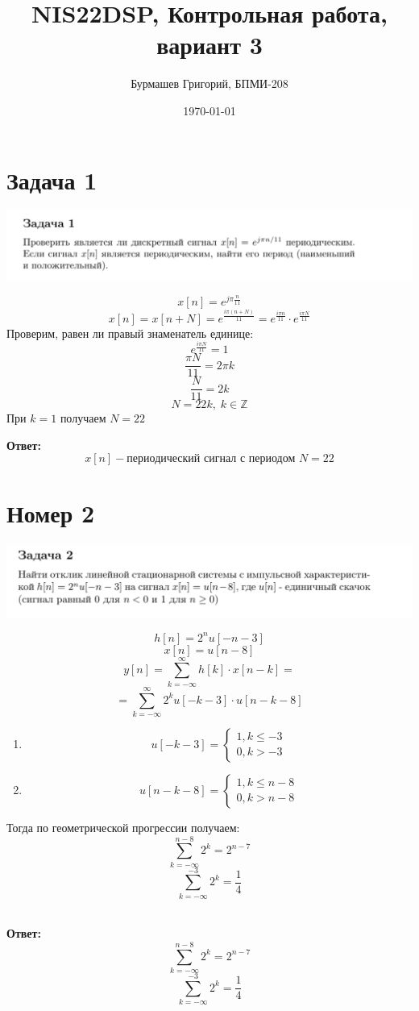 \documentclass[a4paper,12pt]{article}
\author{Бурмашев Григорий, БПМИ-208}
\title{NIS22DSP, Контрольная работа, вариант 3}
\date{\today}
\begin{document}
\maketitle

\section*{Задача 1}
\begin{center}
\includegraphics[scale=0.4]{1.png}
\end{center}
\[
x[n] = e^{j \pi \frac{n}{11}}
\]
\[
x[n] = x[n + N] = e^{\frac{i \pi (n + N)}{11}} = 
e^{\frac{i \pi n}{11}} \cdot e^{\frac{i \pi N}{11}}
\]
Проверим, равен ли правый знаменатель единице:
\[
e^{\frac{i \pi N}{11}} = 1
\]
\[
\frac{\pi N }{11} = 2 \pi k
\]
\[
\frac{N}{11} = 2 k
\]
\[
N = 22k, \; k \in \mathbb{Z}
\]
При $k = 1$ получаем $N = 22$
\begin{center}
\textbf{Ответ: } 
\[
x[n] - \text{периодический сигнал с периодом } N = 22
\]
\end{center}
\clearpage
\section*{Номер 2}
\begin{center}
\includegraphics[scale=0.4]{2.png}
\end{center}
\[
h[n] = 2^n u [-n - 3]
\]
\[
x[n] = u[n - 8]
\]
\[
y[n] = \sum_{k = -\infty}^{\infty } h[k] \cdot x[n - k]  = 
\]
\[
=
\sum_{k = -\infty}^{\infty }  
2^k u[-k - 3] \cdot u[n - k - 8]
\]
\begin{enumerate}
\item
\[
u[-k - 3] = 
\begin{cases}
1, k \leq -3 \\
0, k > -3
\end{cases}
\]
\item
\[
u[n - k - 8 ] = 
\begin{cases}
1, k  \leq n - 8 \\
0, k > n - 8
\end{cases}
\]
\end{enumerate}
Тогда по геометрической прогрессии получаем:
\[
\sum_{k=-\infty}^{n - 8} 2^k = 2^{n - 7}
\]
\[
\sum_{k=-\infty}^{-3} 2^k = \frac{1}{4}
\] 
\begin{center}
\textbf{Ответ: } 
\[
\sum_{k=-\infty}^{n - 8} 2^k = 2^{n - 7}
\]
\[
\sum_{k=-\infty}^{-3} 2^k = \frac{1}{4}
\] 
\end{center}
\clearpage
\end{document}
